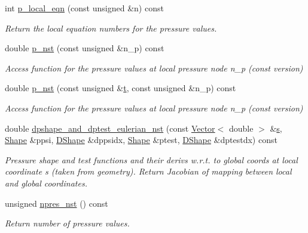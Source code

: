 \begin{DoxyCompactItemize}
int \hyperlink{classoomph_1_1QTaylorHoodElement_a13d4dd087330f26ee6283fe63153867d}{p\+\_\+local\+\_\+eqn} (const unsigned \&n) const
\begin{DoxyCompactList}\small\item\em Return the local equation numbers for the pressure values. \end{DoxyCompactList}\item 
double \hyperlink{classoomph_1_1QTaylorHoodElement_a533ae120f2cde3e5d589b76c08803f09}{p\+\_\+nst} (const unsigned \&n\+\_\+p) const
\begin{DoxyCompactList}\small\item\em Access function for the pressure values at local pressure node n\+\_\+p (const version) \end{DoxyCompactList}\item 
double \hyperlink{classoomph_1_1QTaylorHoodElement_a8aa6aca4730dda3d3e9993e951fa6196}{p\+\_\+nst} (const unsigned \&\hyperlink{cfortran_8h_af6f0bd3dc13317f895c91323c25c2b8f}{t}, const unsigned \&n\+\_\+p) const
\begin{DoxyCompactList}\small\item\em Access function for the pressure values at local pressure node n\+\_\+p (const version) \end{DoxyCompactList}\item 
double \hyperlink{classoomph_1_1QTaylorHoodElement_a361d8f56918429731de4929a75310f26}{dpshape\+\_\+and\+\_\+dptest\+\_\+eulerian\+\_\+nst} (const \hyperlink{classoomph_1_1Vector}{Vector}$<$ double $>$ \&\hyperlink{cfortran_8h_ab7123126e4885ef647dd9c6e3807a21c}{s}, \hyperlink{classoomph_1_1Shape}{Shape} \&ppsi, \hyperlink{classoomph_1_1DShape}{D\+Shape} \&dppsidx, \hyperlink{classoomph_1_1Shape}{Shape} \&ptest, \hyperlink{classoomph_1_1DShape}{D\+Shape} \&dptestdx) const
\begin{DoxyCompactList}\small\item\em Pressure shape and test functions and their derivs w.\+r.\+t. to global coords at local coordinate s (taken from geometry). Return Jacobian of mapping between local and global coordinates. \end{DoxyCompactList}\item 
unsigned \hyperlink{classoomph_1_1QTaylorHoodElement_aaf60ebf583d9671f7adddca94e6029ac}{npres\+\_\+nst} () const
\begin{DoxyCompactList}\small\item\em Return number of pressure values. \end{DoxyCompactList}\item 

\end{DoxyCompactItemize}
